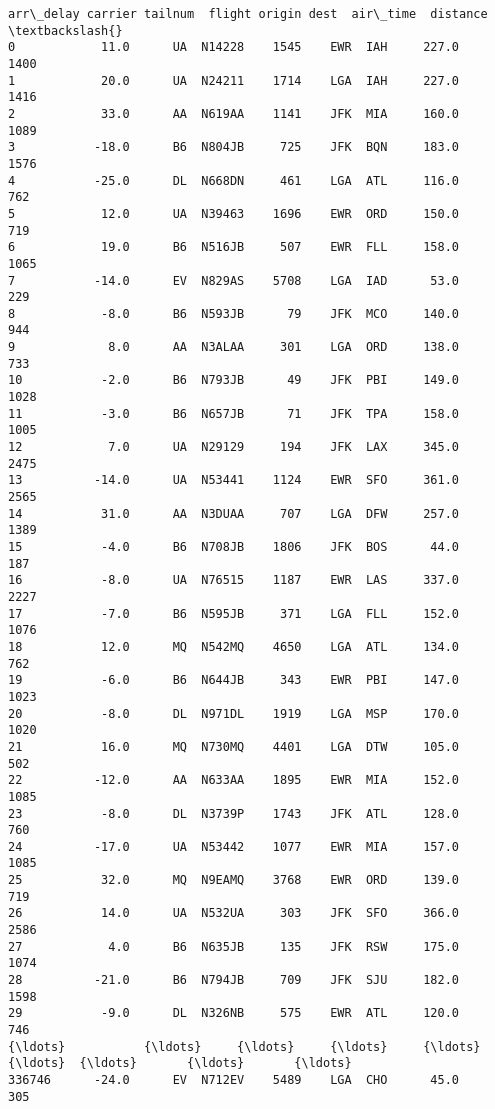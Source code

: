 \documentclass[11pt]{article}
\begin{document}
\begin{Verbatim}[commandchars=\\\{\}]
        arr\_delay carrier tailnum  flight origin dest  air\_time  distance  \textbackslash{}
0            11.0      UA  N14228    1545    EWR  IAH     227.0      1400   
1            20.0      UA  N24211    1714    LGA  IAH     227.0      1416   
2            33.0      AA  N619AA    1141    JFK  MIA     160.0      1089   
3           -18.0      B6  N804JB     725    JFK  BQN     183.0      1576   
4           -25.0      DL  N668DN     461    LGA  ATL     116.0       762   
5            12.0      UA  N39463    1696    EWR  ORD     150.0       719   
6            19.0      B6  N516JB     507    EWR  FLL     158.0      1065   
7           -14.0      EV  N829AS    5708    LGA  IAD      53.0       229   
8            -8.0      B6  N593JB      79    JFK  MCO     140.0       944   
9             8.0      AA  N3ALAA     301    LGA  ORD     138.0       733   
10           -2.0      B6  N793JB      49    JFK  PBI     149.0      1028   
11           -3.0      B6  N657JB      71    JFK  TPA     158.0      1005   
12            7.0      UA  N29129     194    JFK  LAX     345.0      2475   
13          -14.0      UA  N53441    1124    EWR  SFO     361.0      2565   
14           31.0      AA  N3DUAA     707    LGA  DFW     257.0      1389   
15           -4.0      B6  N708JB    1806    JFK  BOS      44.0       187   
16           -8.0      UA  N76515    1187    EWR  LAS     337.0      2227   
17           -7.0      B6  N595JB     371    LGA  FLL     152.0      1076   
18           12.0      MQ  N542MQ    4650    LGA  ATL     134.0       762   
19           -6.0      B6  N644JB     343    EWR  PBI     147.0      1023   
20           -8.0      DL  N971DL    1919    LGA  MSP     170.0      1020   
21           16.0      MQ  N730MQ    4401    LGA  DTW     105.0       502   
22          -12.0      AA  N633AA    1895    EWR  MIA     152.0      1085   
23           -8.0      DL  N3739P    1743    JFK  ATL     128.0       760   
24          -17.0      UA  N53442    1077    EWR  MIA     157.0      1085   
25           32.0      MQ  N9EAMQ    3768    EWR  ORD     139.0       719   
26           14.0      UA  N532UA     303    JFK  SFO     366.0      2586   
27            4.0      B6  N635JB     135    JFK  RSW     175.0      1074   
28          -21.0      B6  N794JB     709    JFK  SJU     182.0      1598   
29           -9.0      DL  N326NB     575    EWR  ATL     120.0       746   
{\ldots}           {\ldots}     {\ldots}     {\ldots}     {\ldots}    {\ldots}  {\ldots}       {\ldots}       {\ldots}   
336746      -24.0      EV  N712EV    5489    LGA  CHO      45.0       305   

\end{Verbatim}
\end{document}
